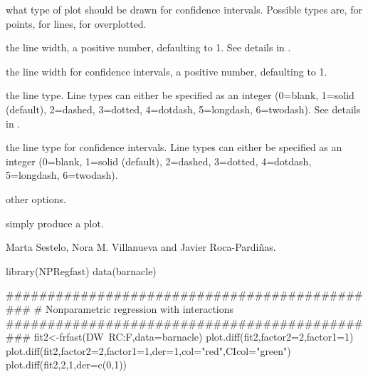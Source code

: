 \begin{Arguments}
\begin{ldescription}
\item[\code{CItype}] 
what type of plot should be drawn for confidence intervals. Possible types are,  for points,  for lines,  for overplotted. 

\item[\code{lwd}] the line width, a positive number, defaulting to 1. See details in .

\item[\code{CIlwd}] the line width for confidence intervals, a positive number, defaulting to 1.

\item[\code{lty}] the line type. Line types can either be specified as an integer (0=blank, 1=solid (default), 2=dashed, 3=dotted, 4=dotdash, 5=longdash, 6=twodash). See details in .

\item[\code{CIlty}] the line type for confidence intervals. Line types can either be specified as an integer (0=blank, 1=solid (default), 2=dashed, 3=dotted, 4=dotdash, 5=longdash, 6=twodash). 

\item[\code{...}] 
other options.

\end{ldescription}
\end{Arguments}
%
\begin{Details}\relax
simply produce a plot.
\end{Details}
%
\begin{Author}\relax
Marta Sestelo, Nora M. Villanueva and Javier Roca-Pardiñas.
\end{Author}
%
\begin{Examples}
\begin{ExampleCode}

library(NPRegfast)
data(barnacle)

##############################################
# Nonparametric regression with interactions
##############################################
fit2<-frfast(DW~RC:F,data=barnacle)
plot.diff(fit2,factor2=2,factor1=1)
plot.diff(fit2,factor2=2,factor1=1,der=1,col="red",CIcol="green")
plot.diff(fit2,2,1,der=c(0,1))
\end{ExampleCode}
\end{Examples}


